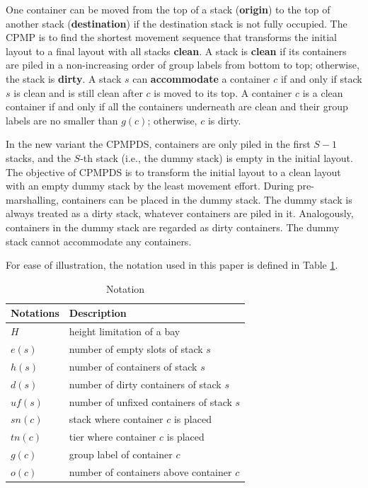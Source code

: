 \documentclass[review,3p,times,authoryear,12pt]{elsarticle}
\begin{document}
One container can be moved from the top of a stack (\textbf{origin}) to the top of another stack (\textbf{destination}) if the destination stack is not fully occupied.
The CPMP is to find the shortest movement sequence that transforms the initial layout to a final layout with all stacks \textbf{clean}.
A stack is \textbf{clean} if its containers are piled in a non-increasing order of group labels from bottom to top; otherwise, the stack is \textbf{dirty}.
A stack $s$ can \textbf{accommodate} a container $c$ if and only if stack $s$ is clean and is still clean after $c$ is moved to its top.
A container $c$ is a clean container if and only if all the containers underneath are clean and their group labels are no smaller than $g(c)$; otherwise, $c$ is dirty.


In the new variant the CPMPDS, containers are only piled in the first $S-1$ stacks, and the $S$-th stack (i.e., the dummy stack) is empty in the initial layout.
The objective of CPMPDS is to transform the initial layout to a clean layout with an empty dummy stack by the least movement effort.
During pre-marshalling, containers can be placed in the dummy stack.
The dummy stack is always treated as a dirty stack, whatever containers are piled in it.
Analogously, containers in the dummy stack are regarded as dirty containers.
The dummy stack cannot accommodate any containers.

For ease of illustration, the notation used in this paper is defined in Table \ref{tab:1}.

\begin{table}[!htb]
  \centering
  \caption{Notation}
  \label{tab:1}
    \begin{tabular}{l|l}
    \hline
    Notations         & Description \\
    \hline
    $H$               &  height limitation of a bay\\
    $e(s)$            &  number of empty slots of stack $s$\\
    $h(s)$            &  number of containers of stack $s$\\
    $d(s)$            &  number of dirty containers of stack $s$\\
    $\mathit{uf}(s)$      &  number of unfixed containers of stack $s$\\
    $\mathit{sn}(c)$      &  stack where container $c$ is placed\\
    $\mathit{tn}(c)$      &  tier where container $c$ is placed\\
    $g(c)$            &  group label of container $c$\\
    $o(c)$          &  number of containers above container $c$\\
    \hline
    \end{tabular}
\end{table}
\end{document}
